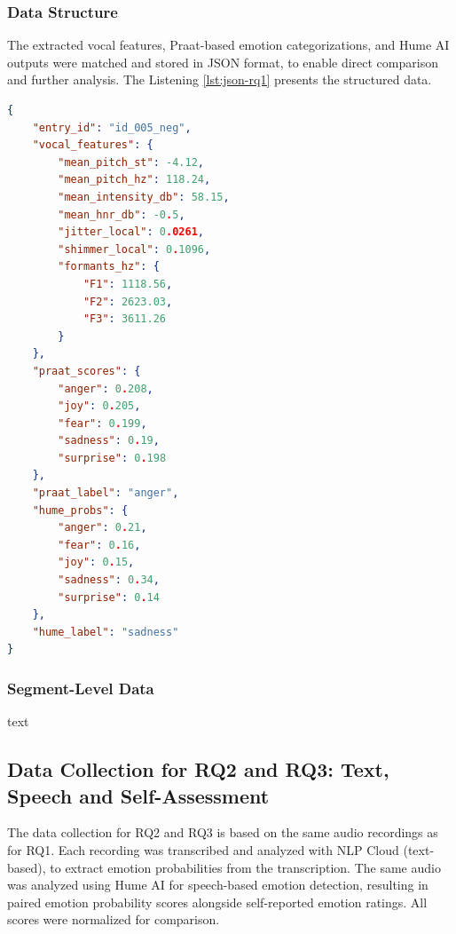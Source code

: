 \subsubsection{Data Structure}
The extracted vocal features, Praat-based emotion categorizations, and Hume AI outputs were matched and stored in JSON format, to enable direct comparison and further analysis. 
The Listening \ref{lst:json-rq1} presents the structured data. 
\begin{center}
\begin{minipage}{0.7\textwidth} 
\begin{lstlisting}[language=json, caption={Example of stored JSON structure for vocal features vs. Hume}, label={lst:json-rq1}]
    {
    "entry_id": "id_005_neg",
    "vocal_features": {
        "mean_pitch_st": -4.12,
        "mean_pitch_hz": 118.24,
        "mean_intensity_db": 58.15,
        "mean_hnr_db": -0.5,
        "jitter_local": 0.0261,
        "shimmer_local": 0.1096,
        "formants_hz": {
            "F1": 1118.56,
            "F2": 2623.03,
            "F3": 3611.26
        }
    },
    "praat_scores": {
        "anger": 0.208,
        "joy": 0.205,
        "fear": 0.199,
        "sadness": 0.19,
        "surprise": 0.198
    },
    "praat_label": "anger",
    "hume_probs": {
        "anger": 0.21,
        "fear": 0.16,
        "joy": 0.15,
        "sadness": 0.34,
        "surprise": 0.14
    },
    "hume_label": "sadness"
}
\end{lstlisting}
\end{minipage}
\end{center} 
\subsubsection{Segment-Level Data}
text

\subsection{Data Collection for RQ2 and RQ3: Text, Speech and Self-Assessment}
\label{sec:datacoll_rq2_rq3}


The data collection for RQ2 and RQ3 is based on the same audio recordings as for RQ1. 
Each recording was transcribed and analyzed with NLP Cloud (text-based), to extract emotion probabilities from the transcription. The same audio was analyzed using Hume AI for speech-based emotion detection, resulting in paired emotion probability scores alongside self-reported emotion ratings. All scores were normalized for comparison.

